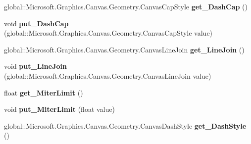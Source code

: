 \begin{DoxyCompactItemize}
global\+::\+Microsoft.\+Graphics.\+Canvas.\+Geometry.\+Canvas\+Cap\+Style {\bfseries get\+\_\+\+Dash\+Cap} ()
\item 
\mbox{\label{interface_microsoft_1_1_graphics_1_1_canvas_1_1_geometry_1_1_i_canvas_stroke_style_a2c6fb2a6009bda6b6bf0b8882ec5b651}} 
void {\bfseries put\+\_\+\+Dash\+Cap} (global\+::\+Microsoft.\+Graphics.\+Canvas.\+Geometry.\+Canvas\+Cap\+Style value)
\item 
\mbox{\label{interface_microsoft_1_1_graphics_1_1_canvas_1_1_geometry_1_1_i_canvas_stroke_style_aa99219b6d76643e93de91296b3261eb8}} 
global\+::\+Microsoft.\+Graphics.\+Canvas.\+Geometry.\+Canvas\+Line\+Join {\bfseries get\+\_\+\+Line\+Join} ()
\item 
\mbox{\label{interface_microsoft_1_1_graphics_1_1_canvas_1_1_geometry_1_1_i_canvas_stroke_style_a9917a7ec85d18fa2508e01a5bea88eb8}} 
void {\bfseries put\+\_\+\+Line\+Join} (global\+::\+Microsoft.\+Graphics.\+Canvas.\+Geometry.\+Canvas\+Line\+Join value)
\item 
\mbox{\label{interface_microsoft_1_1_graphics_1_1_canvas_1_1_geometry_1_1_i_canvas_stroke_style_a75a67b6c8e374ada2860deffb62fd790}} 
float {\bfseries get\+\_\+\+Miter\+Limit} ()
\item 
\mbox{\label{interface_microsoft_1_1_graphics_1_1_canvas_1_1_geometry_1_1_i_canvas_stroke_style_a8cae4d32f3a346d5bc506c2e5c172343}} 
void {\bfseries put\+\_\+\+Miter\+Limit} (float value)
\item 
\mbox{\label{interface_microsoft_1_1_graphics_1_1_canvas_1_1_geometry_1_1_i_canvas_stroke_style_a4e200c8b211b9a0372f10cfc99f37f85}} 
global\+::\+Microsoft.\+Graphics.\+Canvas.\+Geometry.\+Canvas\+Dash\+Style {\bfseries get\+\_\+\+Dash\+Style} ()
\item 
\mbox{\label{interface_microsoft_1_1_graphics_1_1_canvas_1_1_geometry_1_1_i_canvas_stroke_style_a3a3866d0af05bea0d5111d39bad2f7aa}} 

\end{DoxyCompactItemize}
